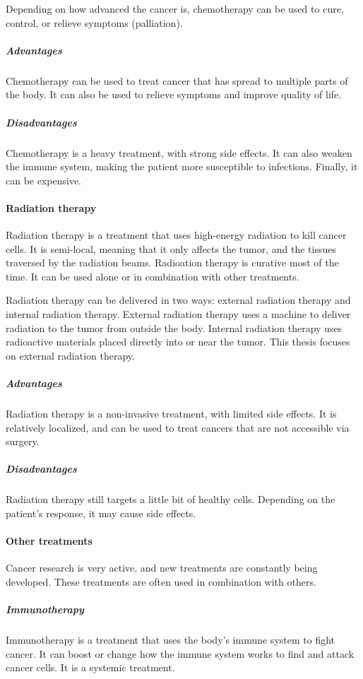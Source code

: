 Depending on how advanced the cancer is, chemotherapy can be used to cure, control, or relieve symptoms (palliation).

\subparagraph{Advantages}
Chemotherapy can be used to treat cancer that has spread to multiple parts of the body.
It can also be used to relieve symptoms and improve quality of life.

\subparagraph{Disadvantages}
Chemotherapy is a heavy treatment, with strong side effects.
It can also weaken the immune system, making the patient more susceptible to infections.
Finally, it can be expensive.

\paragraph{Radiation therapy}
Radiation therapy is a treatment that uses high-energy radiation to kill cancer cells.
It is semi-local, meaning that it only affects the tumor, and the tissues traversed by the radiation beams.
Radioation therapy is curative most of the time.
It can be used alone or in combination with other treatments.

Radiation therapy can be delivered in two ways: external radiation therapy and internal radiation therapy.
External radiation therapy uses a machine to deliver radiation to the tumor from outside the body.
Internal radiation therapy uses radioactive materials placed directly into or near the tumor.
This thesis focuses on external radiation therapy.

\subparagraph{Advantages}
Radiation therapy is a non-invasive treatment, with limited side effects.
It is relatively localized, and can be used to treat cancers that are not accessible via surgery.

\subparagraph{Disadvantages}
Radiation therapy still targets a little bit of healthy cells.
Depending on the patient's response, it may cause side effects.

\paragraph{Other treatments}
Cancer research is very active, and new treatments are constantly being developed.
These treatments are often used in combination with others.

\subparagraph{Immunotherapy}
Immunotherapy is a treatment that uses the body's immune system to fight cancer.
It can boost or change how the immune system works to find and attack cancer cells.
It is a systemic treatment.

